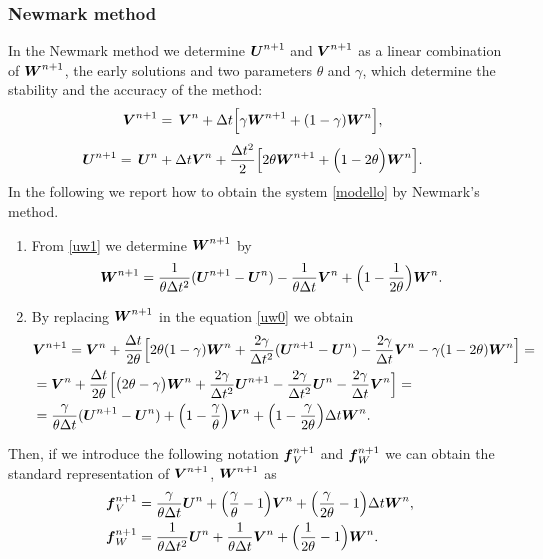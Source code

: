 \documentclass[english,a4paper]{article}
\newcommand{\Ubf}{\text{\mbox{\boldmath $U$}}}
\newcommand{\Abf}{\text{\mbox{\boldmath $W$}}}
\newcommand{\fbf}{\text{\mbox{\boldmath $f$}}}
\newcommand{\Wbf}{\text{\mbox{\boldmath $V$}}}
\begin{document}
\subsubsection{Newmark method}\label{newmark}
In the Newmark method we determine $\Ubf^{n+1}$ and $\Wbf^{n+1}$ as a
linear combination of $\Abf^{n+1}$, the early solutions  and two parameters $\theta$ and
$\gamma$, which determine  the stability and the accuracy of the method:
\begin{eqnarray}\label{uw0}
&\displaystyle\Wbf^{n+1}=\,\Wbf^n+\Delta t\Big[\gamma\Abf^{n+1}+(1-\gamma)\Abf^{n}\Big],
\end{eqnarray}
\begin{eqnarray}\label{uw1}
&\displaystyle\Ubf^{n+1} =\,\Ubf^n+ \Delta t \Wbf^n+\frac{\Delta t^2}{2}\Big[2\theta \Abf^{n+1}+\Big(1-2\theta\Big)\Abf^n\Big].
\end{eqnarray}
In the following we report how to obtain the system   \eqref{modello} by Newmark's  method.
\begin{enumerate}
\item[]From \eqref{uw1} we determine $\Abf^{n+1}$ by 
\begin{equation}\label{aa}
\Abf^{n+1}=\frac{1}{\theta \Delta t^2}  (\Ubf^{n+1}-\Ubf^n) - \frac{1}{\theta
  \Delta t}\Wbf^n+\Big(1-\frac{1}{2\theta}\Big)\Abf^n.
\end{equation}
\item[]By replacing $\Abf^{n+1}$ in  the  equation \eqref{uw0} we obtain
\begin{eqnarray}\label{ww}
&\displaystyle\Wbf^{n+1}=\Wbf^n+\frac{\Delta
  t}{2\theta}\Big[2\theta(1-\gamma)\Abf^n+\frac{2\gamma}{\Delta
  t^2}(\Ubf^{n+1}-\Ubf^n)-\frac{2\gamma}{\Delta
  t}\Wbf^n- \gamma(1-2\theta)\Abf^n\Big]= \nonumber\\
&\displaystyle=\Wbf^n+\frac{\Delta
  t}{2\theta}\Big[\big(2\theta-\gamma\big)\Abf^n+\frac{2\gamma}{\Delta
  t^2}\Ubf^{n+1}-\frac{2\gamma}{\Delta t^2}\Ubf^n-\frac{2\gamma}{\Delta t}\Wbf^n\Big]=\nonumber\\
&\displaystyle=\frac{\gamma}{\theta\Delta t}(\Ubf^{n+1}-\Ubf^n)+
\Big(1-\frac{\gamma}{\theta}\Big)\Wbf^n+\Big(1-\frac{\gamma}{2\theta}\Big)\Delta
t\Abf^n.
\end{eqnarray}
\end{enumerate}
Then, if we introduce  the following notation $\fbf_V^{n+1}$ and $\fbf_W^{n+1}$ we
can obtain  the standard representation of $\Wbf^{n+1}$, $\Abf^{n+1}$ as 
\begin{eqnarray*}
&\displaystyle\fbf_V^{n+1}=\frac{\gamma}{\theta\Delta t}\Ubf^n+
\Big(\frac{\gamma}{\theta}-1\Big)\Wbf^n+\Big(\frac{\gamma}{2\theta}-1\Big)\Delta
t\Abf^n,\\
& \displaystyle\fbf_W^{n+1}=\frac{1}{\theta \Delta t^2} \Ubf^n + \frac{1}{\theta
  \Delta t}\Wbf^n+\Big(\frac{1}{2\theta}-1\Big)\Abf^n.
\end{eqnarray*}
\end{document}
